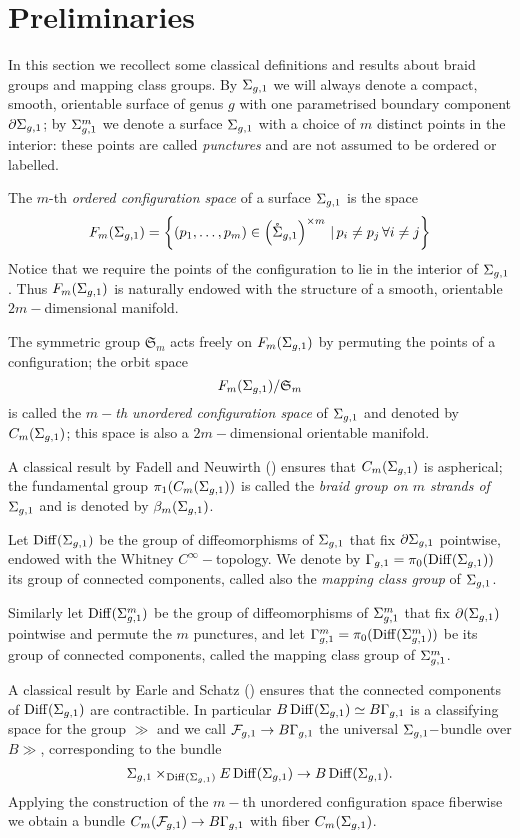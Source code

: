 \section{Preliminaries}
In this section we recollect some classical definitions and results about braid groups and mapping class groups.
By $\Sigma_{g,1}$ we will always denote a compact, smooth, orientable surface of genus $g$ with one parametrised
boundary component $\partial \Sigma_{g,1}$; by $\Sigma_{g,1}^m$ we denote a surface $\Sigma_{g,1}$ with a choice of $m$ distinct
points in the interior: these points are called \emph{punctures} and are not assumed to be ordered
or labelled.

\begin{defn}
 The $m$-th \emph{ordered configuration space} of a surface $\Sigma_{g,1}$ is the space
\[
 F_m(\Sigma_{g,1})=\left\{(p_1,\dots,p_m) \in \left(\mathring{\Sigma}_{g,1}\right)^{\times m}  \,|\,  p_i\neq p_j  \,\forall i\neq j\right\}
\]
 Notice that we require the points of the configuration to lie in the interior of $\Sigma_{g,1}$.
 Thus $F_m(\Sigma_{g,1})$ is naturally endowed with the structure of a smooth, orientable $2m-$dimensional
 manifold.
 
 The symmetric group $\mathfrak{S}_m$ acts freely on $F_m(\Sigma_{g,1})$ by permuting the points of a configuration;
 the orbit space
 \[
 F_m(\Sigma_{g,1})/\mathfrak{S}_m
 \]
 is called the \emph{$m-$th unordered configuration space}
 of $\Sigma_{g,1}$ and denoted by $C_m(\Sigma_{g,1})$; this space is also a $2m-$dimensional orientable manifold.
 
%  
\end{defn}

A classical result by Fadell and Neuwirth (\cite{FadellNeuwirth}) ensures
that $C_m(\Sigma_{g,1})$ is aspherical; the fundamental group $\pi_1(C_m(\Sigma_{g,1}))$ is
called the \emph{braid group on $m$ strands of $\Sigma_{g,1}$} and is denoted by $\beta_{m}(\Sigma_{g,1})$.

\begin{defn}
 \label{def:mcg}
 Let $\operatorname{Diff}(\Sigma_{g,1})$ be the group of diffeomorphisms of $\Sigma_{g,1}$ that fix $\partial\Sigma_{g,1}$ pointwise,
 endowed with the Whitney $C^{\infty}-$topology. We denote by $\Gamma_{g,1}=\pi_0(\operatorname{Diff}(\Sigma_{g,1}))$ its group of connected
 components, called also the \emph{mapping class group} of $\Sigma_{g,1}$.
 
 Similarly let $\operatorname{Diff}(\Sigma_{g,1}^m)$ be the group of diffeomorphisms of $\Sigma_{g,1}^m$ that fix $\partial(\Sigma_{g,1})$
 pointwise and permute the $m$ punctures, and let $\Gamma_{g,1}^m=\pi_0(\operatorname{Diff}(\Sigma_{g,1}^m))$ be its
 group of connected components, called the mapping class group of $\Sigma_{g,1}^m$.
 \end{defn}
 A classical result by Earle and Schatz (\cite{EarleSchatz}) ensures that the connected components
 of $\operatorname{Diff}(\Sigma_{g,1})$ are contractible. In particular $B\operatorname{Diff}(\Sigma_{g,1})\simeq B\Gamma_{g,1}$ is a classifying space for
 the group $\gg$ and we call $\mathcal{F}_{g,1}\to B\Gamma_{g,1}$ the universal $\Sigma_{g,1}-$bundle over $B\gg$, corresponding to
 the bundle
 \[
  \Sigma_{g,1}\times_{\operatorname{Diff}(\Sigma_{g,1})}E\operatorname{Diff}(\Sigma_{g,1})\to B\operatorname{Diff}(\Sigma_{g,1}).
 \]
Applying the construction of the $m-$th unordered configuration space fiberwise we obtain a bundle
$C_m(\mathcal{F}_{g,1})\to B\Gamma_{g,1}$ with fiber $C_m(\Sigma_{g,1})$.

